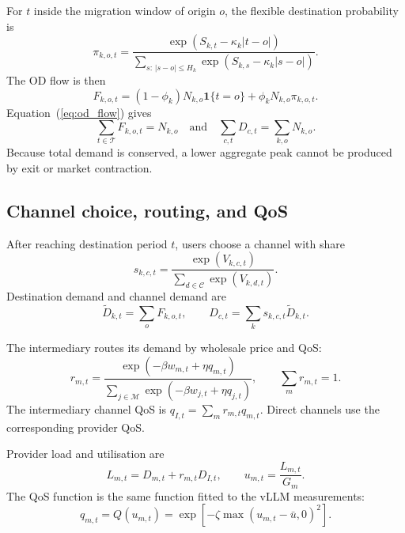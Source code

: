 \documentclass[11pt,a4paper]{article}
\newcommand{\T}{\mathcal{T}}
\newcommand{\M}{\mathcal{M}}
\newcommand{\Channels}{\mathcal{C}}
\begin{document}
For $t$ inside the migration window of origin $o$, the flexible destination probability is
\begin{equation}
\pi_{k,o,t}=
\frac{\exp(S_{k,t}-\kappa_k|t-o|)}
{\sum_{s:\,|s-o|\le H_k}\exp(S_{k,s}-\kappa_k|s-o|)}.
\label{eq:temporal_probability}
\end{equation}
The OD flow is then
\begin{equation}
F_{k,o,t}=(1-\phi_k)N_{k,o}\mathbf{1}\{t=o\}
+\phi_k N_{k,o}\pi_{k,o,t}.
\label{eq:od_flow}
\end{equation}
Equation~(\ref{eq:od_flow}) gives
\begin{equation}
\sum_{t\in\T}F_{k,o,t}=N_{k,o}
\quad\text{and}\quad
\sum_{c,t}D_{c,t}=\sum_{k,o}N_{k,o}.
\label{eq:mass_conservation}
\end{equation}
Because total demand is conserved, a lower aggregate peak cannot be produced by exit or market contraction.

\subsection{Channel choice, routing, and QoS}

After reaching destination period $t$, users choose a channel with share
\begin{equation}
s_{k,c,t}=\frac{\exp(V_{k,c,t})}{\sum_{d\in\Channels}\exp(V_{k,d,t})}.
\label{eq:channel_share}
\end{equation}
Destination demand and channel demand are
\begin{equation}
\widetilde D_{k,t}=\sum_o F_{k,o,t},
\qquad
D_{c,t}=\sum_k s_{k,c,t}\widetilde D_{k,t}.
\label{eq:channel_demand}
\end{equation}

The intermediary routes its demand by wholesale price and QoS:
\begin{equation}
r_{m,t}=
\frac{\exp(-\beta w_{m,t}+\eta q_{m,t})}
{\sum_{j\in\M}\exp(-\beta w_{j,t}+\eta q_{j,t})},
\qquad \sum_m r_{m,t}=1.
\label{eq:routing}
\end{equation}
The intermediary channel QoS is $q_{I,t}=\sum_m r_{m,t}q_{m,t}$. Direct channels use the corresponding provider QoS.

Provider load and utilisation are
\begin{equation}
L_{m,t}=D_{m,t}+r_{m,t}D_{I,t},
\qquad
u_{m,t}=\frac{L_{m,t}}{G_m}.
\label{eq:load_utilisation}
\end{equation}
The QoS function is the same function fitted to the vLLM measurements:
\begin{equation}
q_{m,t}=Q(u_{m,t})
=\exp\left[-\zeta\max(u_{m,t}-\bar u,0)^2\right].
\label{eq:qos}
\end{equation}
\end{document}
